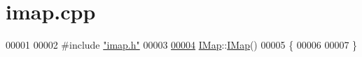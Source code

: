 \hypertarget{a00050_source}{}\section{imap.\+cpp}
\label{a00050_source}

\begin{DoxyCode}
00001 
00002 \textcolor{preprocessor}{#}\textcolor{preprocessor}{include} \hyperlink{a00053}{"imap.h"}
00003 
\hyperlink{a00165_ac705a2e065b5c4604e43a44b488d798a}{00004} \hyperlink{a00165}{IMap}::\hyperlink{a00165_ac705a2e065b5c4604e43a44b488d798a}{IMap}()
00005 \{
00006 
00007 \}
\end{DoxyCode}
